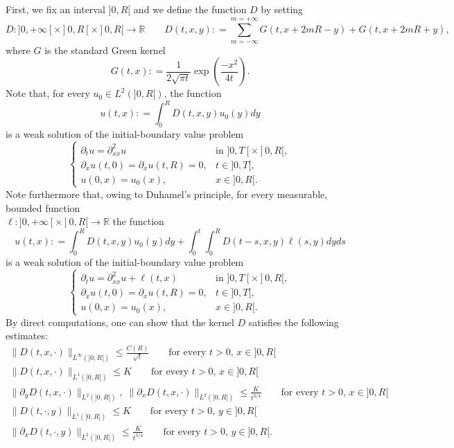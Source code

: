\documentclass[11pt,leqno]{amsart}
\numberwithin{equation}{section}
\begin{document}
First, we fix an interval $]0, R[$ and we define the function $D$ by setting 
\begin{equation}
 \label{e:Di}
     D: ]0, + \infty[ \times ]0, R[ \times ]0, R[ \to {\mathbb{R}} \qquad 
     D(t, x, y) : = \sum_{m= - \infty}^{m = + \infty} G(t, x + 2m R - y)+
     G(t, x + 2m R +y), 
 \end{equation}
 where $G$ is the standard Green kernel 
 $$
     G(t, x) : = \frac{1}{2 \sqrt{\pi t}} \exp \left( \frac{-x^2}{4t}\right). 
 $$
Note that, for every $u_0 \in L^2 (]0, R[)$, the function
$$
     u(t, x) : = \int_0^R D(t, x, y) u_0(y) dy 
$$
is a weak solution of the initial-boundary value problem
\begin{equation*}
\begin{cases}
{\partial_t} u = {\partial_{xx}^2} u & \text{in $]0, T[ \times ]0, R[$} ,  \\
{\partial_x } u(t,0)={\partial_x } u(t,R) = 0, & t \in ]0, T[, \\
u(0,x) = u_0(x), & x \in {]0,R[}.
    \end{cases}
\end{equation*}
Note furthermore that, owing to Duhamel's principle, for every measurable, bounded 
function \\${\ell: ]0, + \infty[ \times ]0, R[ \to {\mathbb{R}}}$
the function
$$
    u(t, x) : = \int_0^R D(t, x, y) u_0(y) dy +
    \int_0^t \! \! \int_0^R D(t -s , x, y) \ell (s, y) dy ds 
$$ 
is a weak solution of the initial-boundary value problem
\begin{equation*}
\begin{cases}
{\partial_t} u = {\partial_{xx}^2} u + \ell(t, x) & \text{in $]0, T[ \times ]0, R[$} ,  \\
{\partial_x } u(t,0)={\partial_x } u(t,R) = 0, & t \in ]0, T[, \\
u(0,x) = u_0(x), & x \in {]0,R[}.
    \end{cases}
\end{equation*}
By direct computations, one can show that the kernel $D$ satisfies the following estimates:
\begin{eqnarray}
    \| D(t, x, \cdot ) \|_{L^\infty (]0, R[)}
    \leq \frac{C(R)}{\sqrt{t}}
    \qquad \text{for every $t>0$, $x \in ]0, R[$} 
    \label{e:Dlinfty} \\
    \| D(t, x, \cdot ) \|_{L^1(]0, R[)}
    \leq K
    \qquad \text{for every $t>0$, $x \in ]0, R[$} 
    \label{e:Duno} \\
     \| \partial_y D(t, x, \cdot ) \|_{L^2 (]0, R[)}, 
     \; \| \partial_x D(t, x, \cdot ) \|_{L^2 (]0, R[)}
    \leq \frac{K}{t^{3/4}}
    \qquad \text{for every $t>0$, $x \in ]0, R[$} 
    \label{e:Dxdue} \\
     \| D(t, \cdot, y ) \|_{L^1(]0, R[)}
    \leq K
    \qquad \text{for every $t>0$, $y \in ]0, R[$} 
    \label{e:Dunox} 
    \\
     \| \partial_x D(t, \cdot, y ) \|_{L^2 (]0, R[)}
    \leq \frac{K}{t^{3/4}}
    \qquad \text{for every $t>0$, $y \in ]0, R[$}.
    \label{e:Dxduex} 
\end{eqnarray}
\end{document}

